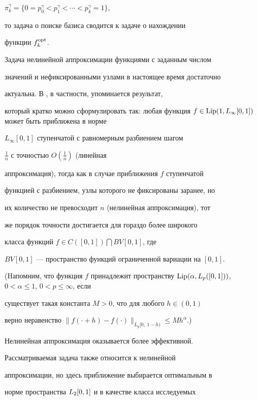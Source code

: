 $\pi_k^\gamma=\{0=p_0^{\gamma}<p_1^{\gamma}<\dotsb<p_k^{\gamma}=1\}$,


то задача о поиске базиса сводится к задаче о нахождении


функции $f_k^{\operatorname{opt}}$.





Задача нелинейной аппроксимации функциями с заданным числом


значений и нефиксированными узлами в настоящее время достаточно


актуальна. В \cite{dv}, в частности, упоминается результат,


который кратко можно сформулировать так: любая функция $f\in


\Lip(1,L_{\infty}[0,1])$ может быть приближена в норме


$L_{\infty}[0,1]$ ступенчатой с равномерным разбиением шагом


$\frac{1}{n}$ с точностью $O(\frac{1}{n})$ (линейная


аппроксимация), тогда как в случае приближения $f$ ступенчатой


функцией с разбиением, узлы которого не фиксированы заранее, но


их количество не превосходит $n$ (нелинейная аппроксимация), тот


же порядок точности достигается для гораздо более широкого


класса функций $f\in C([0,1])\bigcap BV[0,1]$, где


$BV[0,1]$ --- пространство функций ограниченной вариации на $[0,1]$.


(Hапомним, что функция $f$ принадлежит пространству $\Lip(\alpha,


L_p([0,1]))$, $0<\alpha\leq1$, $0<p\leq \infty$, если


существует такая константа $M>0$, что для любого $h\in(0,1)$


верно неравенство $\|f(\cdot +h)-f(\cdot)\|_{L_p[0,\;1-h)}\leq


M h^{\alpha}$.)


Нелинейная аппроксимация оказывается более эффективной.





Рассматриваемая задача также относится к нелинейной


аппроксимации, но здесь приближение выбирается оптимальным в


норме пространства $L_2[0,1]$ и в качестве класса исследуемых


